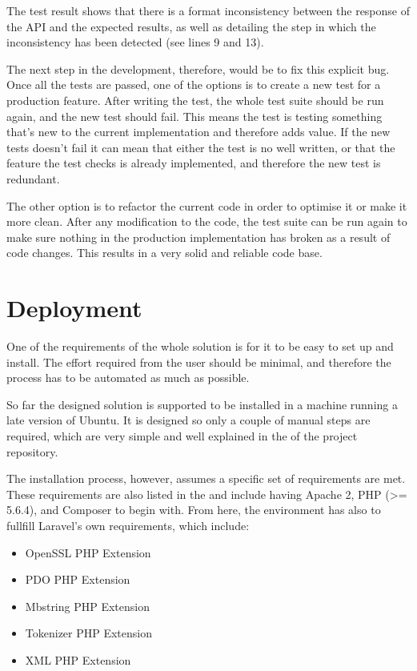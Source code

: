 The test result shows that there is a format inconsistency between the response of the API and the expected results, as well as detailing the step in which the inconsistency has been detected (see lines 9 and 13).

The next step in the development, therefore, would be to fix this explicit bug. Once all the tests are passed, one of the options is to create a new test for a production feature. After writing the test, the whole test suite should be run again, and the new test should fail. This means the test is testing something that’s new to the current implementation and therefore adds value. If the new tests doesn’t fail it can mean that either the test is no well written, or that the feature the test checks is already implemented, and therefore the new test is redundant.

The other option is to refactor the current code in order to optimise it or make it more clean. After any modification to the code, the test suite can be run again to make sure nothing in the production implementation has broken as a result of code changes. This results in a very solid and reliable code base.

\section{Deployment}
One of the requirements of the whole solution is for it to be easy to set up and install. The effort required from the user should be minimal, and therefore the process has to be automated as much as possible.

So far the designed solution is supported to be installed in a machine running a late version of Ubuntu. It is designed so only a couple of manual steps are required, which are very simple and well explained in the  of the project repository.

The installation process, however, assumes a specific set of requirements are met. These requirements are also listed in the  and include having Apache 2, PHP (>= 5.6.4), and Composer to begin with. From here, the environment has also to fullfill Laravel's own requirements, which include:

\begin{itemize}
\item OpenSSL PHP Extension
\item PDO PHP Extension
\item Mbstring PHP Extension
\item Tokenizer PHP Extension
\item XML PHP Extension
\end{itemize}

